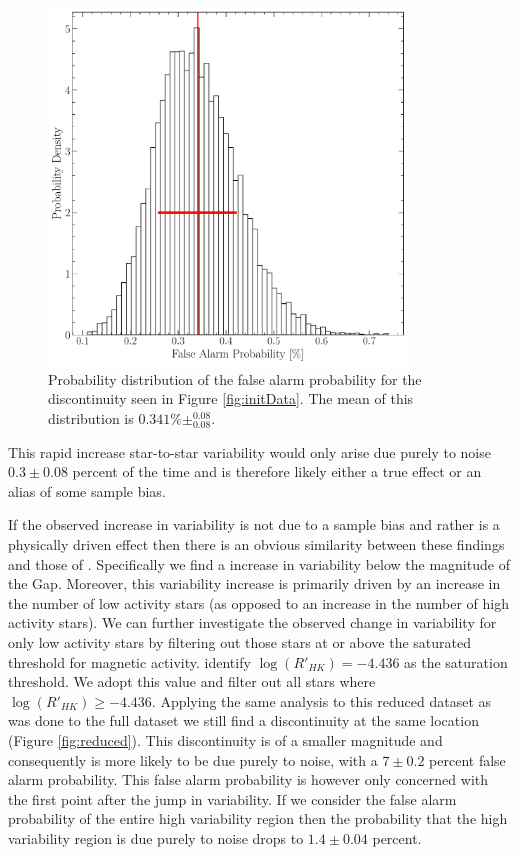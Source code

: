 \begin{figure}
  \centering
  \includegraphics[width=0.85\textwidth]{figures/jaoMagActivity/fpDist.pdf}
  \caption{Probability distribution of the false alarm probability for the
  discontinuity seen in Figure \ref{fig:initData}. The mean of this
  distribution is $0.341\%\pm^{0.08}_{0.08}$.}
  \label{fig:dist}
\end{figure}

This rapid increase star-to-star variability would only arise due purely to
noise $0.3\pm0.08$ percent of the time and is therefore likely either a true
effect or an alias of some sample bias.

If the observed increase in variability is not due to a sample bias and rather
is a physically driven effect then there is an obvious similarity between these
findings and those of \citet{Jao2023}. Specifically we find a increase in
variability below the magnitude of the Gap. Moreover, this variability
increase is primarily driven by an increase in the number of low activity stars
(as opposed to an increase in the number of high activity stars). We can
further investigate the observed change in variability for only low activity
stars by filtering out those stars at or above the saturated threshold for
magnetic activity. \citet{Boudreaux2022} identify $\log(R'_{HK}) = -4.436$ as
the saturation threshold. We adopt this value and filter out all stars where
$\log(R'_{HK}) \geq -4.436$. Applying the same analysis to this reduced dataset
as was done to the full dataset we still find a discontinuity at the same
location (Figure \ref{fig:reduced}). This discontinuity is of a smaller
magnitude and consequently is more likely to be due purely to noise, with a
$7\pm0.2$ percent false alarm probability. This false alarm probability is
however only concerned with the first point after the jump in variability. If
we consider the false alarm probability of the entire high variability region
then the probability that the high variability region is due purely to noise
drops to $1.4\pm0.04$ percent.

